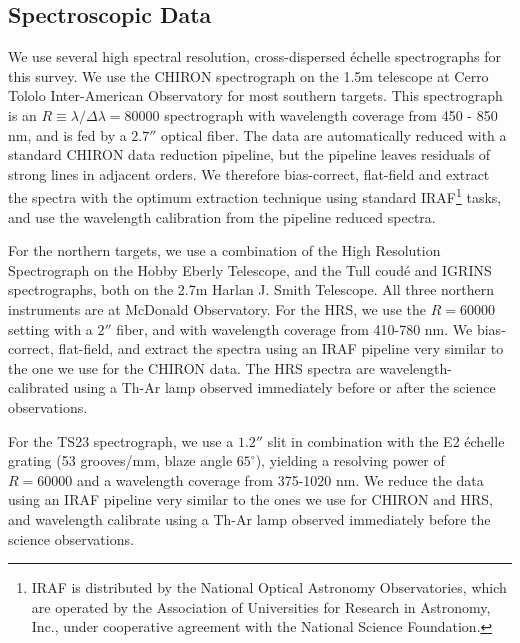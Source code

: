 \documentclass{emulateapj}
\begin{document}
\subsection{Spectroscopic Data}
\label{subsec:specdata}
We use several high spectral resolution, cross-dispersed \'echelle spectrographs for this survey. We use the CHIRON spectrograph \citep{CHIRON} on the 1.5m telescope at Cerro Tololo Inter-American Observatory for most southern targets. This spectrograph is an $R\equiv \lambda / \Delta \lambda = 80000$ spectrograph with wavelength coverage from 450 - 850 nm, and is fed by a $2.7''$ optical fiber. The data are automatically reduced with a standard CHIRON data reduction pipeline, but the pipeline leaves residuals of strong lines in adjacent orders. We therefore bias-correct, flat-field and extract the spectra with the optimum extraction technique \citep{Horne1986} using standard IRAF\footnote{IRAF is distributed by the National Optical Astronomy Observatories, which are operated by the Association of Universities for Research in Astronomy, Inc., under cooperative agreement with the National Science Foundation.} tasks, and use the wavelength calibration from the pipeline reduced spectra.

For the northern targets, we use a combination of the High Resolution Spectrograph \citep[HRS,][]{HRS} on the Hobby Eberly Telescope, and the Tull coud\'e \citep[TS23,][]{TS23} and IGRINS \citep{IGRINS} spectrographs, both on the 2.7m Harlan J. Smith Telescope. All three northern instruments are at McDonald Observatory. For the HRS, we use the $R = 60000$ setting with a $2''$ fiber, and with wavelength coverage from 410-780 nm. We bias-correct, flat-field, and extract the spectra using an IRAF pipeline very similar to the one we use for the CHIRON data. The HRS spectra are wavelength-calibrated using a Th-Ar lamp observed immediately before or after the science observations.

For the TS23 spectrograph, we use a $1.2''$ slit in combination with the E2 \'echelle grating (53 grooves/mm, blaze angle $65^{\circ}$), yielding a resolving power of $R=60000$ and a wavelength coverage from 375-1020 nm. We reduce the data using an IRAF pipeline very similar to the ones we use for CHIRON and HRS, and wavelength calibrate using a Th-Ar lamp observed immediately before the science observations.
\end{document}
